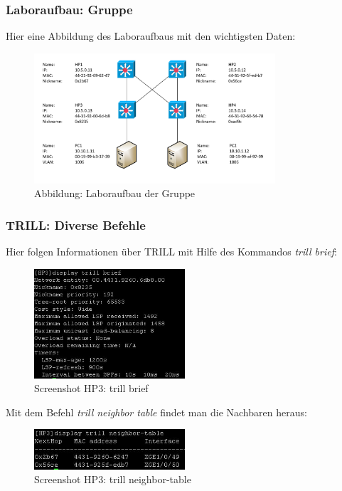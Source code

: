 \documentclass[a4,12pt]{scrartcl}
\begin{document}
\subsubsection{Laboraufbau: Gruppe}
Hier eine Abbildung des Laboraufbaus mit den wichtigsten Daten: 
\begin{figure} [H]
	\begin{center}
	\includegraphics[width=0.80\textwidth]{./draws/trill_ex2_laboraufbau.pdf}
	\caption{Abbildung: Laboraufbau der Gruppe}
	\label{x}
	\end{center}
\end{figure}


\subsubsection{TRILL: Diverse Befehle}
Hier folgen Informationen über TRILL mit Hilfe des Kommandos \textit{trill brief}:
\begin{figure} [H]
	\begin{center}
	\includegraphics[width=0.50\textwidth]{./pictures/brief.jpg}
	\caption{Screenshot HP3: trill brief}
	\label{x}
	\end{center}
\end{figure}

Mit dem Befehl \textit{trill neighbor table} findet man die Nachbaren heraus: 
\begin{figure} [H]
	\begin{center}
	\includegraphics[width=0.50\textwidth]{./pictures/neighbor-table.jpg}
	\caption{Screenshot HP3: trill neighbor-table}
	\label{x}
	\end{center}
\end{figure}
\end{document}
